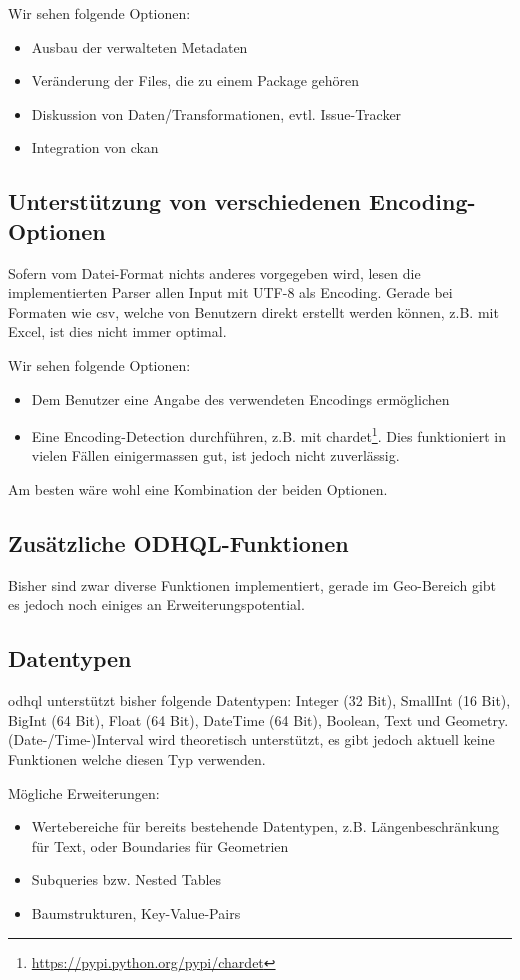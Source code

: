 Wir sehen folgende Optionen:
\begin{itemize}
\item Ausbau der verwalteten Metadaten
\item Veränderung der Files, die zu einem Package gehören
\item Diskussion von Daten/Transformationen, evtl. Issue-Tracker
\item Integration von \acs{ckan}
\end{itemize}

\subsection{Unterstützung von verschiedenen Encoding-Optionen}
Sofern vom Datei-Format nichts anderes vorgegeben wird, lesen die implementierten Parser allen Input mit UTF-8 als Encoding. Gerade bei Formaten wie \acs{csv}, welche von Benutzern direkt erstellt werden können, z.B. mit Excel, ist dies nicht immer optimal.

Wir sehen folgende Optionen:
\begin{itemize}
\item Dem Benutzer eine Angabe des verwendeten Encodings ermöglichen
\item Eine Encoding-Detection durchführen, z.B. mit chardet\footnote{\url{https://pypi.python.org/pypi/chardet}}. Dies funktioniert in vielen Fällen einigermassen gut, ist jedoch nicht zuverlässig.
\end{itemize}

Am besten wäre wohl eine Kombination der beiden Optionen.

\subsection{Zusätzliche ODHQL-Funktionen}
Bisher sind zwar diverse Funktionen implementiert, gerade im Geo-Bereich gibt es jedoch noch einiges an Erweiterungspotential.

\subsection{Datentypen}
\acs{odhql} unterstützt bisher folgende Datentypen: Integer (32 Bit), SmallInt (16 Bit), BigInt (64 Bit), Float (64 Bit), DateTime (64 Bit), Boolean, Text und Geometry. (Date-/Time-)Interval wird theoretisch unterstützt, es gibt jedoch aktuell keine Funktionen welche diesen Typ verwenden.

Mögliche Erweiterungen:
\begin{itemize}
\item Wertebereiche für bereits bestehende Datentypen, z.B. Längenbeschränkung für Text, oder Boundaries für Geometrien
\item Subqueries bzw. Nested Tables
\item Baumstrukturen, Key-Value-Pairs
\end{itemize}

